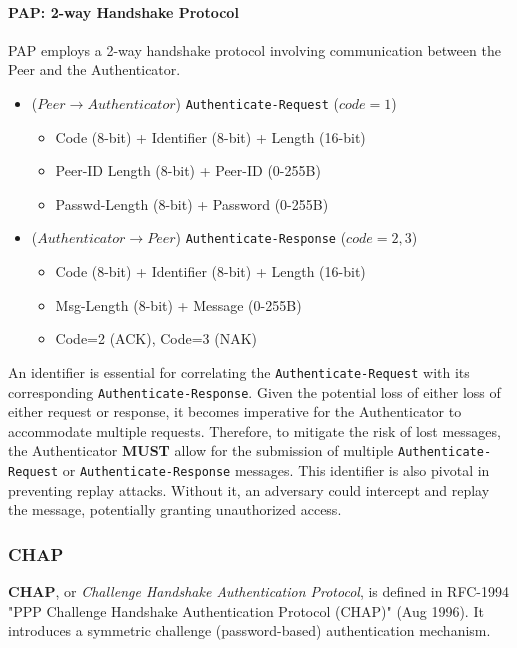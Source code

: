 \paragraph{PAP: 2-way Handshake Protocol}
PAP employs a 2-way handshake protocol involving communication between the Peer and the Authenticator.

\begin{itemize}
    \item ($Peer \rightarrow Authenticator$) \texttt{Authenticate-Request} ($code=1$)
          \begin{itemize}
              \item Code (8-bit) + Identifier (8-bit) + Length (16-bit)
              \item Peer-ID Length (8-bit) + Peer-ID (0-255B)
              \item Passwd-Length (8-bit) + Password (0-255B)
          \end{itemize}
    \item ($Authenticator \rightarrow Peer$) \texttt{Authenticate-Response} ($code= 2, 3$)
          \begin{itemize}
              \item Code (8-bit) + Identifier (8-bit) + Length (16-bit)
              \item Msg-Length (8-bit) + Message (0-255B)
              \item Code=2 (ACK), Code=3 (NAK)
          \end{itemize}
\end{itemize}

An identifier is essential for correlating the \texttt{Authenticate-Request} with its corresponding \texttt{Authenticate-Response}. Given the potential loss of either loss of either request or response, it becomes imperative for the Authenticator to accommodate multiple requests. Therefore, to mitigate the risk of lost messages, the Authenticator \textbf{MUST} allow for the submission of multiple \texttt{Authenticate-Request} or \texttt{Authenticate-Response} messages.
This identifier is also pivotal in preventing replay attacks. Without it, an adversary could intercept and replay the message, potentially granting unauthorized access.



\subsubsection{CHAP}
\textbf{CHAP}, or \textit{Challenge Handshake Authentication Protocol}, is defined in RFC-1994 "PPP Challenge Handshake Authentication Protocol (CHAP)" (Aug 1996). It introduces a symmetric challenge (password-based) authentication mechanism.

